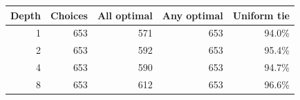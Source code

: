 \begin{tabular}{rrrrr}\toprule
Depth & Choices & All optimal & Any optimal & Uniform tie\\\midrule
1 & 653 & 571 & 653 & 94.0\%\\
2 & 653 & 592 & 653 & 95.4\%\\
4 & 653 & 590 & 653 & 94.7\%\\
8 & 653 & 612 & 653 & 96.6\%\\
\bottomrule\end{tabular}
